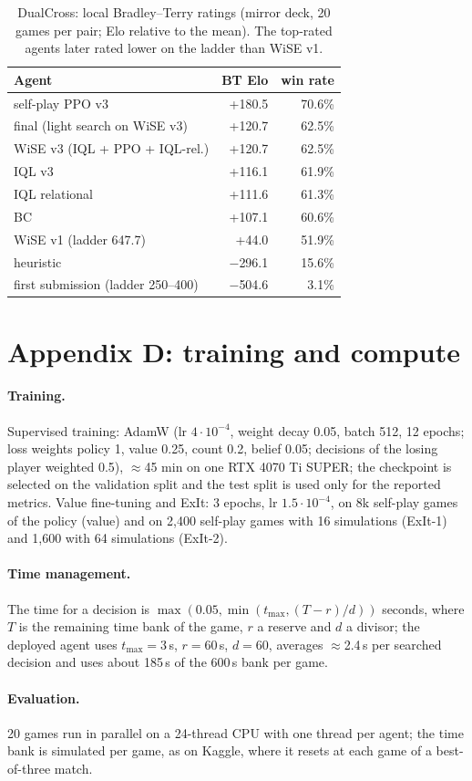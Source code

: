\documentclass{article}
\begin{document}
\begin{table}[h]
\caption{DualCross: local Bradley--Terry ratings (mirror deck, 20 games per pair; Elo relative to the mean). The top-rated agents later rated lower on the ladder than WiSE v1.}
\begin{center}\begin{small}
\begin{tabular}{@{}lrr@{}}
\toprule
Agent & BT Elo & win rate \\
\midrule
self-play PPO v3 & +180.5 & 70.6\% \\
final (light search on WiSE v3) & +120.7 & 62.5\% \\
WiSE v3 (IQL + PPO + IQL-rel.) & +120.7 & 62.5\% \\
IQL v3 & +116.1 & 61.9\% \\
IQL relational & +111.6 & 61.3\% \\
BC & +107.1 & 60.6\% \\
WiSE v1 (ladder 647.7) & +44.0 & 51.9\% \\
heuristic & $-$296.1 & 15.6\% \\
first submission (ladder 250--400) & $-$504.6 & 3.1\% \\
\bottomrule
\end{tabular}
\end{small}\end{center}
\end{table}

\section*{Appendix D: training and compute}\label{app:train}
\paragraph*{Training.} Supervised training: AdamW (lr $4\cdot10^{-4}$, weight decay 0.05, batch 512, 12 epochs; loss weights policy 1, value 0.25, count 0.2, belief 0.05; decisions of the losing player weighted 0.5), $\approx$45 min on one RTX 4070 Ti SUPER; the checkpoint is selected on the validation split and the test split is used only for the reported metrics. Value fine-tuning and ExIt: 3 epochs, lr $1.5\cdot10^{-4}$, on 8k self-play games of the policy (value) and on 2{,}400 self-play games with 16 simulations (ExIt-1) and 1{,}600 with 64 simulations (ExIt-2).
\paragraph*{Time management.} The time for a decision is $\max(0.05,\min(t_{\max},(T-r)/d))$ seconds, where $T$ is the remaining time bank of the game, $r$ a reserve and $d$ a divisor; the deployed agent uses $t_{\max}{=}3$\,s, $r{=}60$\,s, $d{=}60$, averages $\approx$2.4\,s per searched decision and uses about 185\,s of the 600\,s bank per game.
\paragraph*{Evaluation.} 20 games run in parallel on a 24-thread CPU with one thread per agent; the time bank is simulated per game, as on Kaggle, where it resets at each game of a best-of-three match.
\end{document}
